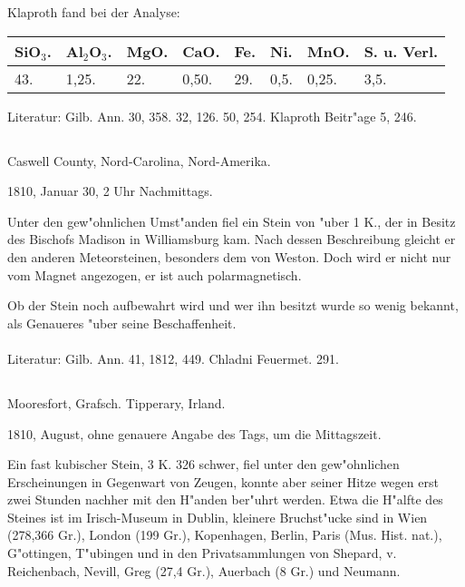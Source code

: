 \documentclass[a4paper, 11pt, oneside]{article}
\begin{document}
Klaproth fand bei der Analyse:
\begin{table}[!ht]
    \centering\swabfamily\Large
    \begin{tabular}{l l l l l l l l}
        SiO$_{3}$. & Al$_{2}$O$_{3}$. & MgO. & CaO. & Fe. & Ni. & MnO. & S. u. Verl. \\ \hline
        43. & 1,25. & 22. & 0,50. & 29. & 0,5. & 0,25. & 3,5. \\
    \end{tabular}
\end{table}

\normalsize
Literatur: Gilb. Ann. 30, 358. 32, 126. 50, 254. Klaproth Beitr"age 5, 246.
\subsection{}
\LARGE
\paragraph{}
Caswell County, Nord-Carolina, Nord-Amerika.

1810, Januar 30, 2 Uhr Nachmittags.

Unter den gew"ohnlichen Umst"anden fiel ein Stein von "uber 1 K., der in Besitz des Bischofs Madison in Williamsburg kam. Nach dessen Beschreibung gleicht er den anderen Meteorsteinen, besonders dem von Weston. Doch wird er nicht nur vom Magnet angezogen, er ist auch polarmagnetisch.

Ob der Stein noch aufbewahrt wird und wer ihn besitzt wurde so wenig bekannt, als Genaueres "uber seine Beschaffenheit.
\normalsize
\paragraph{}
Literatur: Gilb. Ann. 41, 1812, 449. Chladni Feuermet. 291.
\subsection{}
\LARGE
\paragraph{}
Mooresfort, Grafsch. Tipperary, Irland.

1810, August, ohne genauere Angabe des Tags, um die Mittagszeit.

Ein fast kubischer Stein, 3 K. 326 schwer, fiel unter den gew"ohnlichen Erscheinungen in Gegenwart von Zeugen, konnte aber seiner Hitze wegen erst zwei Stunden nachher mit den H"anden ber"uhrt werden. Etwa die H"alfte des Steines ist im Irisch-Museum in Dublin, kleinere Bruchst"ucke sind in Wien (278,366 Gr.), London (199 Gr.), Kopenhagen, Berlin, Paris (Mus. Hist. nat.), G"ottingen, T"ubingen und in den Privatsammlungen von Shepard, v. Reichenbach, Nevill, Greg (27,4 Gr.), Auerbach (8 Gr.) und Neumann.
\end{document}
